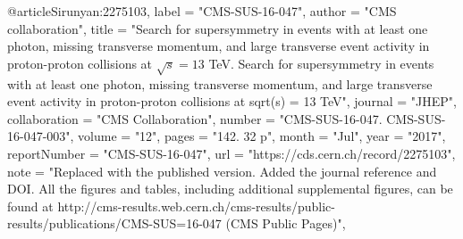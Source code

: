 @article{Sirunyan:2275103,
      label          = "CMS-SUS-16-047",
      author        = "{CMS collaboration}",
      title         = "{Search for supersymmetry in events with at least one
                       photon, missing transverse momentum, and large transverse
                       event activity in proton-proton collisions at $ \sqrt{s}=13
                       $ TeV. Search for supersymmetry in events with at least one
                       photon, missing transverse momentum, and large transverse
                       event activity in proton-proton collisions at sqrt(s) = 13
                       TeV}",
      journal       = "JHEP",
      collaboration = "CMS Collaboration",
      number        = "CMS-SUS-16-047. CMS-SUS-16-047-003",
      volume        = "12",
      pages         = "142. 32 p",
      month         = "Jul",
      year          = "2017",
      reportNumber  = "CMS-SUS-16-047",
      url           = "https://cds.cern.ch/record/2275103",
      note          = "Replaced with the published version. Added the journal
                       reference and DOI. All the figures and tables, including
                       additional supplemental figures, can be found at
                       http://cms-results.web.cern.ch/cms-results/public-results/publications/CMS-SUS=16-047
                       (CMS Public Pages)",
}

